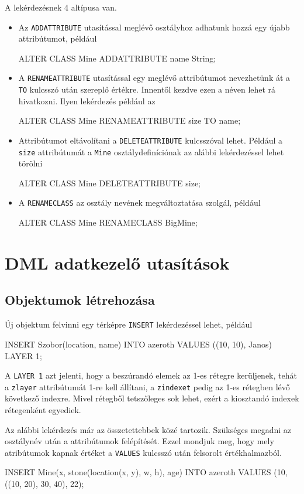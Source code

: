 A lekérdezésnek 4 altípusa van.
\begin{itemize}
\item
Az \texttt{ADDATTRIBUTE} utasítással meglévő osztályhoz adhatunk hozzá egy újabb attribútumot, például
\begin{sql}
ALTER CLASS Mine ADDATTRIBUTE name String;
\end{sql}
\item
A \texttt{RENAMEATTRIBUTE} utasítással egy meglévő attribútumot nevezhetünk át a \texttt{TO} kulcsszó után szereplő értékre. Innentől kezdve ezen a néven lehet rá hivatkozni. Ilyen lekérdezés például az
\begin{sql}
ALTER CLASS Mine RENAMEATTRIBUTE size TO name;
\end{sql}
\item
Attribútumot eltávolítani a \texttt{DELETEATTRIBUTE} kulcsszóval lehet. Például a \texttt{size} attribútumát a \texttt{Mine} osztálydefiníciónak az alábbi lekérdezéssel lehet törölni
\begin{sql}
ALTER CLASS Mine DELETEATTRIBUTE size;
\end{sql}
\item
A \texttt{RENAMECLASS} az osztály nevének megváltoztatása szolgál, például
\begin{sql}
ALTER CLASS Mine RENAMECLASS BigMine;
\end{sql}
\end{itemize}

\section{DML adatkezelő utasítások}

\subsection{Objektumok létrehozása}

Új objektum felvinni egy térképre \texttt{INSERT} lekérdezéssel lehet, például
\begin{sql}
INSERT Szobor(location, name) INTO azeroth
VALUES ((10, 10), Janos) LAYER 1;
\end{sql}
A \texttt{LAYER 1} azt jelenti, hogy a beszúrandó elemek az 1-es rétegre kerüljenek, tehát a \texttt{zlayer} attribútumát 1-re kell állítani, a \texttt{zindexet} pedig az 1-es rétegben lévő következő indexre. Mivel rétegből tetszőleges sok lehet, ezért a kiosztandó indexek rétegenként egyediek.

Az alábbi lekérdezés már az összetettebbek közé tartozik. Szükséges megadni az osztálynév után a attribútumok felépítését. Ezzel mondjuk meg, hogy mely atribútumok kapnak értéket a \texttt{VALUES} kulcsszó után felsorolt értékhalmazból.
\begin{sql}
INSERT Mine(x, stone(location(x, y), w, h), age) INTO azeroth
VALUES (10, ((10, 20), 30, 40), 22);
\end{sql}

